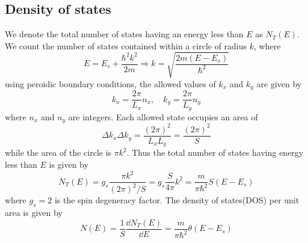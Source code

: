 \documentclass[11pt,a4paper]{book}
\theoremstyle{plain}
\theoremstyle{definition}
\theoremstyle{remark}
\begin{document}
\subsection{Density of states}
We denote the total number of states having an energy less than $E$ as $N_T(E)$. We count the number of states contained within a circle of radius $k$, where
\begin{equation}
    E = E_s + \frac{\hbar^2 k^2}{2 m} \Rightarrow k = \sqrt{\frac{2 m (E - E_s)}{\hbar^2}}
\end{equation}
using peroidic boundary conditions, the allowed values of $k_x$ and $k_y$ are given by
\begin{equation}
    k_x = \frac{2 \pi}{L_x} n_x, \quad k_y = \frac{2 \pi}{L_y} n_y
\end{equation}
where $n_x$ and $n_y$ are integers. Each allowed state occupies an area of
\begin{equation}
    \Delta k_x \Delta k_y = \frac{(2 \pi)^2}{L_x L_y} = \frac{(2 \pi)^2}{S}
\end{equation}
while the area of the circle is $\pi k^2$. Thus the total number of states having energy less than $E$ is given by
\begin{equation}
    N_T(E) = g_s \frac{\pi k^2}{(2 \pi)^2 / S} = g_s \frac{S}{4 \pi} k^2 = \frac{m}{\pi \hbar^2} S (E-E_s)
\end{equation}
where $g_s = 2$ is the spin degeneracy factor. The density of states(DOS) per unit area is given by
\begin{equation}
    N(E) = \frac{1}{S} \frac{\dd N_T(E)}{\dd E} = \frac{m}{\pi \hbar^2}\theta(E - E_s)
\end{equation}
\end{document}
